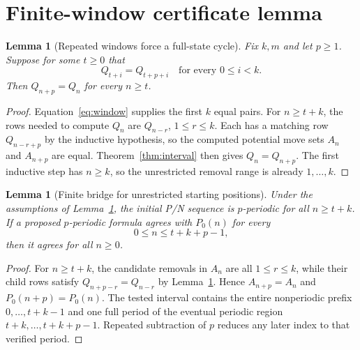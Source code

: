 \documentclass[11pt]{article}
\newtheorem{lemma}[theorem]{Lemma}
\begin{document}
\section{Finite-window certificate lemma}
\begin{lemma}[Repeated windows force a full-state cycle]\label{lem:window}
Fix $k,m$ and let $p\ge1$.  Suppose for some $t\ge0$ that
\begin{equation}\label{eq:window}
Q_{t+i}=Q_{t+p+i}\quad\text{for every }0\le i<k.
\end{equation}
Then $Q_{n+p}=Q_n$ for every $n\ge t$.
\end{lemma}
\begin{proof}
Equation~\eqref{eq:window} supplies the first $k$ equal pairs.
For $n\ge t+k$, the rows needed to compute $Q_n$ are
$Q_{n-r}$, $1\le r\le k$.  Each has a matching row $Q_{n-r+p}$
by the inductive hypothesis, so the computed potential move sets
$A_n$ and $A_{n+p}$ are equal.  Theorem~\ref{thm:interval}
then gives $Q_n=Q_{n+p}$.  The first inductive step has $n\ge k$,
so the unrestricted removal range is already $1,\ldots,k$.
\end{proof}

\begin{lemma}[Finite bridge for unrestricted starting positions]
\label{lem:bridge}
Under the assumptions of Lemma~\ref{lem:window}, the initial P/N sequence
is $p$-periodic for all $n\ge t+k$.
If a proposed $p$-periodic formula agrees with $P_0(n)$ for every
\begin{equation}\label{eq:bridge}
0\le n\le t+k+p-1,
\end{equation}
then it agrees for all $n\ge0$.
\end{lemma}
\begin{proof}
For $n\ge t+k$, the candidate removals in $A_n$ are all $1\le r\le k$,
while their child rows satisfy $Q_{n+p-r}=Q_{n-r}$ by
Lemma~\ref{lem:window}.  Hence $A_{n+p}=A_n$ and
$P_0(n+p)=P_0(n)$.  The tested interval contains the entire
nonperiodic prefix $0,\ldots,t+k-1$ and one full period of the
eventual periodic region $t+k,\ldots,t+k+p-1$.  Repeated subtraction
of $p$ reduces any later index to that verified period.
\end{proof}
\end{document}
